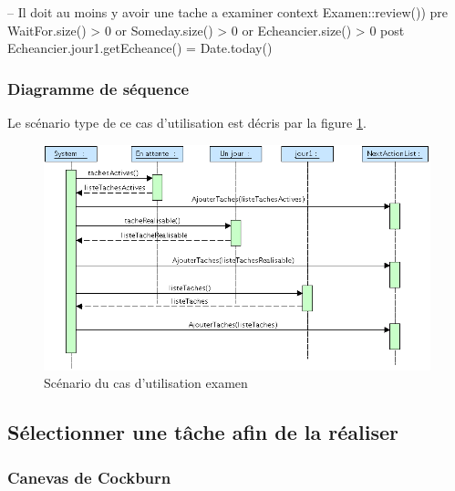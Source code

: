 \begin{ocl}
-- Il doit au moins y avoir une tache a examiner
context Examen::review())
pre WaitFor.size() > 0
	or Someday.size() > 0
	or Echeancier.size() > 0
post Echeancier.jour1.getEcheance() = Date.today()
\end{ocl}

\subsubsection{Diagramme de séquence}
Le scénario type de ce cas d'utilisation est décris par la figure \ref{reviewSequence}.
\begin{figure}[!ht]
\begin{center}
\includegraphics[width=12cm]{images/reviewSequence.png}
\caption{Scénario du cas d'utilisation examen}
\label{reviewSequence}
\end{center}
\end{figure}


\subsection{Sélectionner une tâche afin de la réaliser}

\subsubsection{Canevas de Cockburn}

